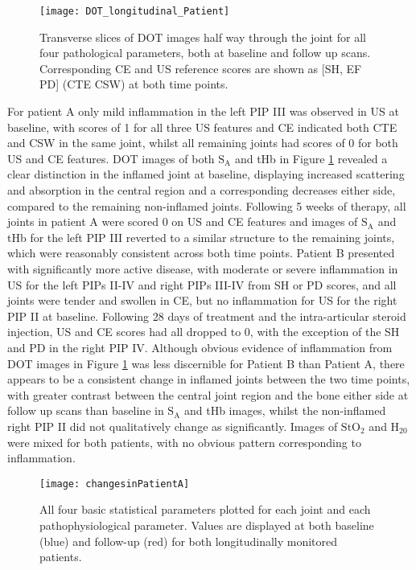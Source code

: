 \documentclass[twoside]{bhamthesis}
\theoremstyle{definition}
\begin{document}
\begin{figure}[!ht]
\centering\texttt{[image: DOT\_longitudinal\_Patient]}\caption{Transverse slices of DOT images half way through the joint for all four pathological parameters, both at baseline and follow up scans. Corresponding CE and US reference scores are shown as [SH, EF PD] (CTE CSW) at both time points.}
\label{DOT_longitudinal_Patient}
\end{figure}

For patient A only mild inflammation in the left PIP III was observed in US at baseline, with scores of 1 for all three US features and CE indicated both CTE and CSW in the same joint, whilst all remaining joints had scores of 0 for both US and CE features. DOT images of both $\mathrm{S_A}$ and tHb in Figure \ref{DOT_longitudinal_Patient} revealed a clear distinction in the inflamed joint at baseline, displaying increased scattering and absorption in the central region and a corresponding decreases either side, compared to the remaining non-inflamed joints. Following 5 weeks of therapy, all joints in patient A were scored 0 on US and CE features and images of $\mathrm{S_A}$ and tHb for the left PIP III reverted to a similar structure to the remaining joints, which were reasonably consistent across both time points. Patient B presented with significantly more active disease, with moderate or severe inflammation in US for the left PIPs II-IV and right PIPs III-IV from SH or PD scores, and all joints were tender and swollen in CE, but no inflammation for US for the right PIP II at baseline. Following 28 days of treatment and the intra-articular steroid injection, US and CE scores had all dropped to 0, with the exception of the SH and PD in the right PIP IV. Although obvious evidence of inflammation from DOT images in Figure \ref{DOT_longitudinal_Patient} was less discernible for Patient B  than Patient A, there appears to be a consistent change in inflamed joints between the two time points, with greater contrast between the central joint region and the bone either side at follow up scans than baseline in $\mathrm{S_A}$ and tHb images, whilst the non-inflamed right PIP II did not qualitatively change as significantly. Images of $\mathrm{StO_2}$ and $\mathrm{H_20}$ were mixed for both patients, with no obvious pattern corresponding to inflammation.  

\begin{figure}[!ht]
\centering\texttt{[image: changesinPatientA]}\caption{All four basic statistical parameters plotted for each joint and each pathophysiological parameter. Values are displayed at both baseline (blue) and follow-up (red) for both longitudinally monitored patients.}
\label{changesinPatientA} 
\end{figure}
\end{document}
